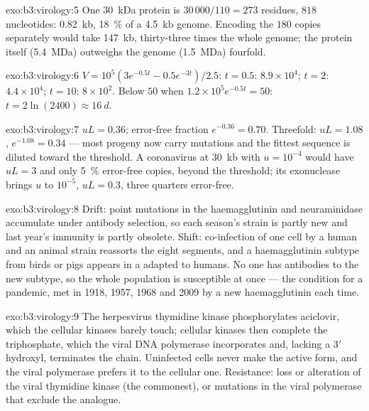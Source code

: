 \begin{solution}{exo:b3:virology:5}
One \qty{30}{kDa} protein is $30\,000/110 = 273$ residues, $818$
nucleotides: \qty{0.82}{kb}, \qty{18}{\%} of a \qty{4.5}{kb} genome.
Encoding the $180$ copies separately would take \qty{147}{kb},
thirty-three times the whole genome; the  protein itself
(\qty{5.4}{MDa}) outweighs the genome (\qty{1.5}{MDa}) fourfold.
\end{solution}

\begin{solution}{exo:b3:virology:6}
$V = 10^{5}(3e^{-0.5t} - 0.5e^{-3t})/2.5$: $t = 0.5$: $8.9\times
10^{4}$; $t = 2$: $4.4\times 10^{4}$; $t = 10$: $8\times 10^{2}$. Below
$50$ when $1.2\times 10^{5}e^{-0.5t} = 50$: $t = 2\ln(2400) \approx
\qty{16}{d}$.
\end{solution}

\begin{solution}{exo:b3:virology:7}
$uL = 0.36$; error-free fraction $e^{-0.36} = 0.70$. Threefold: $uL =
1.08$, $e^{-1.08} = 0.34$ --- most progeny now carry mutations and the
fittest sequence is diluted toward the threshold. A coronavirus at
\qty{30}{kb} with $u = 10^{-4}$ would have $uL = 3$ and only \qty{5}{\%}
error-free copies, beyond the threshold; its exonuclease brings $u$ to
$10^{-5}$, $uL = 0.3$, three quarters error-free.
\end{solution}

\begin{solution}{exo:b3:virology:8}
Drift: point mutations in the haemagglutinin and neuraminidase
accumulate under antibody selection, so each season's strain is
partly new and last year's immunity is partly obsolete. Shift: co-infection
of one cell by a human and an animal strain reassorts the eight
segments, and a haemagglutinin subtype from birds or pigs appears in a
 adapted to humans. No one has antibodies to the new subtype, so
the whole population is susceptible at once --- the condition for a
pandemic, met in 1918, 1957, 1968 and 2009 by a new haemagglutinin each
time.
\end{solution}

\begin{solution}{exo:b3:virology:9}
The herpesvirus thymidine kinase phosphorylates aciclovir, which the
cellular kinases barely touch; cellular kinases then complete the
triphosphate, which the viral DNA polymerase incorporates and, lacking
a 3$'$ hydroxyl, terminates the chain. Uninfected cells never make the
active form, and the viral polymerase prefers it to the cellular one.
Resistance: loss or alteration of the viral thymidine kinase (the
commonest), or mutations in the viral polymerase that exclude the
analogue.
\end{solution}

